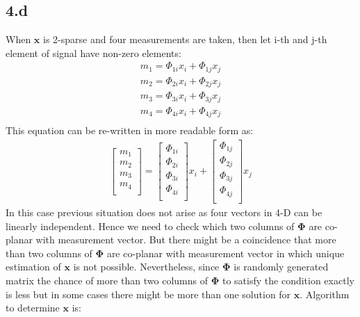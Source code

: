 \documentclass[12pt]{article}
\begin{document}
\subsection*{4.d}
When $\boldsymbol{x}$ is 2-sparse and four measurements are taken, then let i-th and j-th element of signal have non-zero elements:
\begin{align*}
    m_1 = \Phi_{1i}x_i+\Phi_{1j}x_j\\
    m_2 = \Phi_{2i}x_i+\Phi_{2j}x_j\\
    m_3 = \Phi_{3i}x_i+\Phi_{3j}x_j\\
    m_4 = \Phi_{4i}x_i+\Phi_{4j}x_j\\
\end{align*}
This equation can be re-written in more readable form as:
\begin{align*}
    \begin{bmatrix} 
    m_1 \\
    m_2 \\
    m_3 \\
    m_4 \\
    \end{bmatrix} =
    \begin{bmatrix} 
    \Phi_{1i} \\
    \Phi_{2i} \\
    \Phi_{3i} \\
    \Phi_{4i} \\
    \end{bmatrix}x_i +
    \begin{bmatrix} 
    \Phi_{1j} \\
    \Phi_{2j} \\
    \Phi_{3j} \\
    \Phi_{4j} \\
    \end{bmatrix}x_j
\end{align*}
In this case previous situation does not arise as four vectors in 4-D can be linearly independent. Hence we need to check which two columns of $\boldsymbol{\Phi}$ are co-planar with measurement vector. But there might be a coincidence that more than two columns of $\boldsymbol{\Phi}$ are co-planar with measurement vector in which unique estimation of $\boldsymbol{x}$ is not possible. Nevertheless, since $\boldsymbol{\Phi}$ is randomly generated matrix the chance of more than two columns of $\boldsymbol{\Phi}$ to satisfy the condition exactly is less but in some cases there might be more than one solution for $\boldsymbol{x}$. Algorithm to determine $\boldsymbol{x}$ is:
\end{document}
